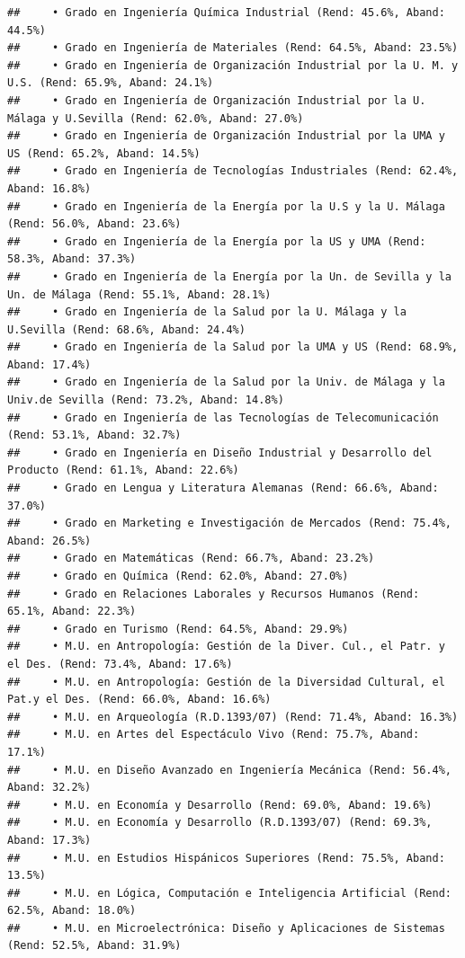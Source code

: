 \documentclass[
]{article}
\begin{document}
\begin{verbatim}
##     • Grado en Ingeniería Química Industrial (Rend: 45.6%, Aband: 44.5%)
##     • Grado en Ingeniería de Materiales (Rend: 64.5%, Aband: 23.5%)
##     • Grado en Ingeniería de Organización Industrial por la U. M. y U.S. (Rend: 65.9%, Aband: 24.1%)
##     • Grado en Ingeniería de Organización Industrial por la U. Málaga y U.Sevilla (Rend: 62.0%, Aband: 27.0%)
##     • Grado en Ingeniería de Organización Industrial por la UMA y US (Rend: 65.2%, Aband: 14.5%)
##     • Grado en Ingeniería de Tecnologías Industriales (Rend: 62.4%, Aband: 16.8%)
##     • Grado en Ingeniería de la Energía por la U.S y la U. Málaga (Rend: 56.0%, Aband: 23.6%)
##     • Grado en Ingeniería de la Energía por la US y UMA (Rend: 58.3%, Aband: 37.3%)
##     • Grado en Ingeniería de la Energía por la Un. de Sevilla y la Un. de Málaga (Rend: 55.1%, Aband: 28.1%)
##     • Grado en Ingeniería de la Salud por la U. Málaga y la U.Sevilla (Rend: 68.6%, Aband: 24.4%)
##     • Grado en Ingeniería de la Salud por la UMA y US (Rend: 68.9%, Aband: 17.4%)
##     • Grado en Ingeniería de la Salud por la Univ. de Málaga y la Univ.de Sevilla (Rend: 73.2%, Aband: 14.8%)
##     • Grado en Ingeniería de las Tecnologías de Telecomunicación (Rend: 53.1%, Aband: 32.7%)
##     • Grado en Ingeniería en Diseño Industrial y Desarrollo del Producto (Rend: 61.1%, Aband: 22.6%)
##     • Grado en Lengua y Literatura Alemanas (Rend: 66.6%, Aband: 37.0%)
##     • Grado en Marketing e Investigación de Mercados (Rend: 75.4%, Aband: 26.5%)
##     • Grado en Matemáticas (Rend: 66.7%, Aband: 23.2%)
##     • Grado en Química (Rend: 62.0%, Aband: 27.0%)
##     • Grado en Relaciones Laborales y Recursos Humanos (Rend: 65.1%, Aband: 22.3%)
##     • Grado en Turismo (Rend: 64.5%, Aband: 29.9%)
##     • M.U. en Antropología: Gestión de la Diver. Cul., el Patr. y el Des. (Rend: 73.4%, Aband: 17.6%)
##     • M.U. en Antropología: Gestión de la Diversidad Cultural, el Pat.y el Des. (Rend: 66.0%, Aband: 16.6%)
##     • M.U. en Arqueología (R.D.1393/07) (Rend: 71.4%, Aband: 16.3%)
##     • M.U. en Artes del Espectáculo Vivo (Rend: 75.7%, Aband: 17.1%)
##     • M.U. en Diseño Avanzado en Ingeniería Mecánica (Rend: 56.4%, Aband: 32.2%)
##     • M.U. en Economía y Desarrollo (Rend: 69.0%, Aband: 19.6%)
##     • M.U. en Economía y Desarrollo (R.D.1393/07) (Rend: 69.3%, Aband: 17.3%)
##     • M.U. en Estudios Hispánicos Superiores (Rend: 75.5%, Aband: 13.5%)
##     • M.U. en Lógica, Computación e Inteligencia Artificial (Rend: 62.5%, Aband: 18.0%)
##     • M.U. en Microelectrónica: Diseño y Aplicaciones de Sistemas (Rend: 52.5%, Aband: 31.9%)

\end{verbatim}
\end{document}
